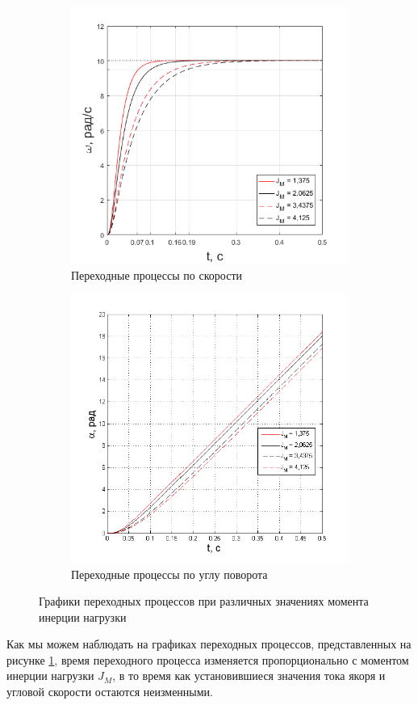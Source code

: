 \documentclass[fleqn, a4paper, 11pt, russian]{article}
\begin{document}
	\begin{figure}[ht!]\ContinuedFloat
		\centering
		\begin{subfigure}[b]{0.48\textwidth}
			\includegraphics[width = \textwidth]{Jvar/JvarOmega}
			\caption{Переходные процессы по скорости}
		\end{subfigure}
		\hfill
		\begin{subfigure}[b]{0.48\textwidth}
			\includegraphics[width = \textwidth]{Jvar/JvarAlpha}
			\caption{Переходные процессы по углу поворота}
		\end{subfigure}
		\caption{Графики переходных процессов при различных значениях момента инерции нагрузки}
		\label{JVar}
	\end{figure}
	Как мы можем наблюдать на графиках переходных процессов, представленных на рисунке \ref{JVar}, время переходного процесса изменяется пропорционально с моментом инерции нагрузки $J_M$, в то время как установившиеся значения тока якоря и угловой скорости остаются неизменными.
	\clearpage
\end{document}
